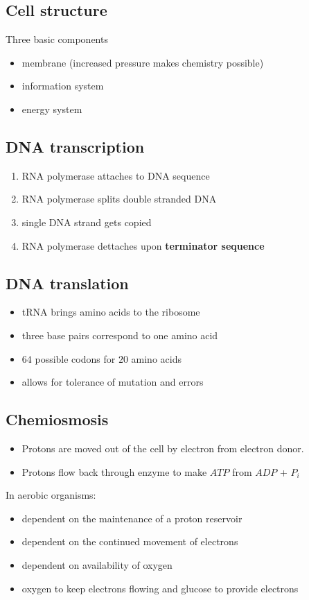 \documentclass{article}
\theoremstyle{sltheorem}
\begin{document}
\subsection{Cell structure}
Three basic components
\begin{itemize}
	\item membrane (increased pressure makes chemistry possible)
	\item information system
	\item energy system
\end{itemize}
\subsection{DNA transcription}
\begin{enumerate}
	\item RNA polymerase attaches to DNA sequence
	\item RNA polymerase splits double stranded DNA
	\item single DNA strand gets copied
	\item RNA polymerase dettaches upon \textbf{terminator sequence}
\end{enumerate}
\subsection{DNA translation}
\begin{itemize}
	\item tRNA brings amino acids to the ribosome
	\item three base pairs correspond to one amino acid
	\item $64$ possible codons for $20$ amino acids
	\item allows for tolerance of mutation and errors
\end{itemize}
\subsection{Chemiosmosis}
\begin{itemize}
	\item Protons are moved out of the cell by electron from electron donor.
	\item Protons flow back through enzyme to make $ATP$ from $ADP$ + $P_i$
\end{itemize}
In aerobic organisms:
\begin{itemize}
	\item dependent on the maintenance of a proton reservoir
	\item dependent on the continued movement of electrons
	\item dependent on availability of oxygen
	\item oxygen to keep electrons flowing and glucose to provide electrons
\end{itemize}
\end{document}

